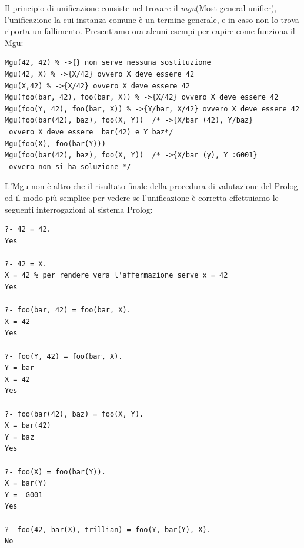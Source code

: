 Il principio di unificazione consiste nel trovare il \emph{mgu}(Most general unifier),
l'unificazione la cui instanza comune è un termine generale, e in caso non lo trova riporta un fallimento.\newline
Presentiamo ora alcuni esempi per capire come funziona il Mgu:
\begin{verbatim}
Mgu(42, 42) % ->{} non serve nessuna sostituzione
Mgu(42, X) % ->{X/42} ovvero X deve essere 42
Mgu(X,42) % ->{X/42} ovvero X deve essere 42
Mgu(foo(bar, 42), foo(bar, X)) % ->{X/42} ovvero X deve essere 42
Mgu(foo(Y, 42), foo(bar, X)) % ->{Y/bar, X/42} ovvero X deve essere 42
Mgu(foo(bar(42), baz), foo(X, Y))  /* ->{X/bar (42), Y/baz}
 ovvero X deve essere  bar(42) e Y baz*/
Mgu(foo(X), foo(bar(Y)))
Mgu(foo(bar(42), baz), foo(X, Y))  /* ->{X/bar (y), Y_:G001}
 ovvero non si ha soluzione */
\end{verbatim}
L'Mgu non è altro che il risultato finale della procedura di valutazione del Prolog ed il modo più semplice per vedere
se l'unificazione è corretta effettuiamo le seguenti interrogazioni al sistema Prolog:
\begin{verbatim}
?- 42 = 42.
Yes

?- 42 = X.
X = 42 % per rendere vera l'affermazione serve x = 42
Yes

?- foo(bar, 42) = foo(bar, X).
X = 42
Yes

?- foo(Y, 42) = foo(bar, X).
Y = bar
X = 42
Yes

?- foo(bar(42), baz) = foo(X, Y).
X = bar(42)
Y = baz
Yes

?- foo(X) = foo(bar(Y)).
X = bar(Y)
Y = _G001
Yes

?- foo(42, bar(X), trillian) = foo(Y, bar(Y), X).
No
\end{verbatim}

